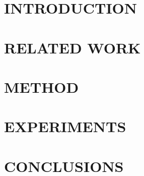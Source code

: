 \documentclass[letterpaper, 10 pt, conference]{ieeeconf}  %
\begin{document}
\section{INTRODUCTION}


\section{RELATED WORK}


\section{METHOD}


\section{EXPERIMENTS}


\section{CONCLUSIONS}














% 

\end{document}

